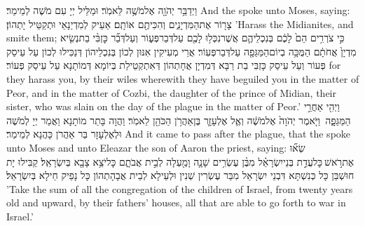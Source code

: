 {וַיְדַבֵּ֥ר יְהֹוָ֖ה אֶל\maqqaf מֹשֶׁ֥ה לֵּאמֹֽר׃}
{וּמַלֵּיל יְיָ עִם מֹשֶׁה לְמֵימַר׃}
{And the \lord\space spoke unto Moses, saying:}{}
{צָר֖וֹר אֶת\maqqaf הַמִּדְיָנִ֑ים וְהִכִּיתֶ֖ם אוֹתָֽם׃}
{אַעֵיק לְמִדְיַנָאֵי וּתְקַטֵּיל יָתְהוֹן׃}
{’Harass the Midianites, and smite them;}{}
{כִּ֣י צֹרְרִ֥ים הֵם֙ לָכֶ֔ם בְּנִכְלֵיהֶ֛ם אֲשֶׁר\maqqaf נִכְּל֥וּ לָכֶ֖ם עַל\maqqaf דְּבַר\maqqaf פְּע֑וֹר וְעַל\maqqaf דְּבַ֞ר כׇּזְבִּ֨י בַת\maqqaf נְשִׂ֤יא מִדְיָן֙ אֲחֹתָ֔ם הַמֻּכָּ֥ה בְיוֹם\maqqaf הַמַּגֵּפָ֖ה עַל\maqqaf דְּבַר\maqqaf פְּעֽוֹר׃}
{אֲרֵי מְעִיקִין אִנּוּן לְכוֹן בְּנִכְלֵיהוֹן דְּנַכִּילוּ לְכוֹן עַל עֵיסַק פְּעוֹר וְעַל עֵיסַק כָּזְבִּי בַת רַבָּא דְּמִדְיָן אֲחָתְהוֹן דְּאִתְקְטֵילַת בְּיוֹמָא דְּמוֹתָנָא עַל עֵיסַק פְּעוֹר׃}
{for they harass you, by their wiles wherewith they have beguiled you in the matter of Peor, and in the matter of Cozbi, the daughter of the prince of Midian, their sister, who was slain on the day of the plague in the matter of Peor.’}{}
\newperek
{}%
{וַיְהִ֖י אַחֲרֵ֣י הַמַּגֵּפָ֑ה \petucha  וַיֹּ֤אמֶר יְהֹוָה֙ אֶל\maqqaf מֹשֶׁ֔ה וְאֶ֧ל אֶלְעָזָ֛ר בֶּן\maqqaf אַהֲרֹ֥ן הַכֹּהֵ֖ן לֵאמֹֽר׃}
{וַהֲוָה בָּתַר מוֹתָנָא וַאֲמַר יְיָ לְמֹשֶׁה וּלְאֶלְעָזָר בַּר אַהֲרֹן כָּהֲנָא לְמֵימַר׃}
{And it came to pass after the plague, that the \lord\space spoke unto Moses and unto Eleazar the son of Aaron the priest, saying:}{}
{שְׂא֞וּ אֶת\maqqaf רֹ֣אשׁ \legarmeh  כׇּל\maqqaf עֲדַ֣ת בְּנֵי\maqqaf יִשְׂרָאֵ֗ל מִבֶּ֨ן עֶשְׂרִ֥ים שָׁנָ֛ה וָמַ֖עְלָה לְבֵ֣ית אֲבֹתָ֑ם כׇּל\maqqaf יֹצֵ֥א צָבָ֖א בְּיִשְׂרָאֵֽל׃}
{קַבִּילוּ יָת חוּשְׁבַּן כָּל כְּנִשְׁתָּא דִּבְנֵי יִשְׂרָאֵל מִבַּר עֶשְׂרִין שְׁנִין וּלְעֵילָא לְבֵית אֲבָהָתְהוֹן כָּל נָפֵיק חֵילָא בְּיִשְׂרָאֵל׃}
{’Take the sum of all the congregation of the children of Israel, from twenty years old and upward, by their fathers’ houses, all that are able to go forth to war in Israel.’}{}
